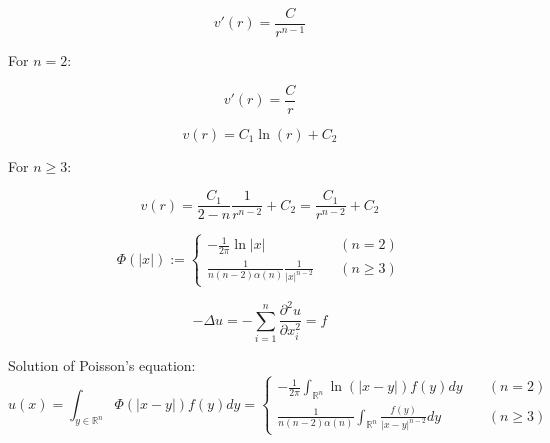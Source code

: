\documentclass{blog}
\begin{document}
\begin{equation*}
    v'(r) = \frac{C}{r^{n-1}}
\end{equation*}

For $n = 2$:

\begin{equation*}
    v'(r) = \frac{C}{r}
\end{equation*}

\begin{equation*}
    v(r) = C_{1}\ln(r) + C_{2}
\end{equation*}

For $n \geq 3$:

\begin{equation*}
    v(r) = \frac{C_{1}}{2-n} \frac{1}{r^{n-2}} + C_{2} = \frac{C_{1}}{r^{n-2}} + C_{2}
\end{equation*}

\begin{definition}
    \begin{equation}
        \label{eq:laplace-equation-solution}
        \Phi(|x|) :=
        \begin{cases}
            -\frac{1}{2\pi}\ln|x| \quad                        & (n = 2)    \\
            \frac{1}{n(n-2)\alpha(n)}\frac{1}{|x|^{n-2}} \quad & (n \geq 3)
        \end{cases}
    \end{equation}
\end{definition}

\begin{definition}
    \begin{equation}
        \label{eq:poisson-equation}
        -\Delta u = -\sum_{i=1}^{n} \frac{\partial^{2} u}{\partial x_{i}^{2}} = f
    \end{equation}
\end{definition}

\begin{theorem}
    Solution of Poisson's equation:
    \begin{equation}
        \label{eq:poisson-equation-solution}
        u(x) = \int_{y \in \mathbb{R}^{n}} \Phi(|x-y|) f(y) dy =
        \begin{cases}
            -\frac{1}{2\pi} \int_{\mathbb{R}^{n}} \ln\left( |x-y| \right) f(y) dy \quad       & (n = 2)    \\
            \frac{1}{n(n-2)\alpha(n)} \int_{\mathbb{R}^{n}} \frac{f(y)}{|x-y|^{n-2}} dy \quad & (n \geq 3)
        \end{cases}
    \end{equation}
\end{theorem}
\end{document}
